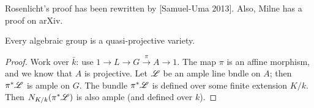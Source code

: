 Rosenlicht's proof has been rewritten by [Samuel-Uma 2013]. Also, Milne 
has a proof on arXiv. 

\begin{coro}
Every algebraic group is a quasi-projective variety. 
\end{coro}
\begin{proof}
Work over $\bar k$: use $1 \to L\to  G \xrightarrow\pi A \to 1$. The map 
$\pi$ is an affine morphism, and we know that $A$ is projective. Let $\mathscr{L}$ 
be an ample line bndle on $A$; then $\pi^\ast\mathscr{L}$ is ample on $G$. The 
bundle $\pi^\ast\mathscr{L}$ is defined over some finite extension $K/k$. Then 
$N_{K/k}(\pi^\ast \mathscr{L})$ is also ample (and defined over $k$). 
\end{proof}




